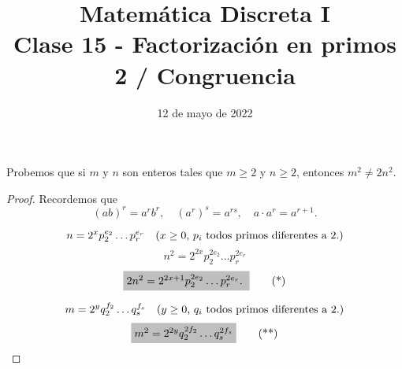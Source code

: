 \documentclass{beamer}
\title[Clase 15 - Factorización en primos]{Matemática Discreta I \\ Clase 15 - Factorización en primos 2 / Congruencia}
\institute[]{\normalsize FAMAF / UNC
    \\[\baselineskip] ${}^{}$
    \\[\baselineskip]
}
\date[12/05/2022]{12 de mayo de 2022}
\begin{document}
    
    \frame{\titlepage} 
    
    
    \begin{frame}
        
        \begin{ejemplo} Probemos que si $m$ y $n$ son enteros tales que
            $m\ge 2$ y $n\ge 2$, entonces $m^2 \not=2n^2$.
        \end{ejemplo}\pause
        \begin{proof} \pause

        Recordemos que
        $$
        (ab)^r = a^rb^r, \quad (a^r)^s = a^{r s}, \quad  a\cdot a^r = a^{r+1}. 
        $$    


            $$ n = 2^{x}p_2^{e_2}\ldots p_r^{e_r}\text{\quad ($x \ge 0$, $p_i$ todos primos diferentes a 2.)} $$
            $$ n^2 = 2^{2x}p_2^{2e_2}\ldots p_r^{2e_r}$$
            \begin{equation}
                \colorbox{lightgray}{$2n^2= 2^{2x+1}p_2^{2e_2}\ldots p_r^{2e_r}.$ }\tag{*}
            \end{equation}
            
            $$
            m = 2^{y}q_2^{f_2}\ldots q_s^{f_s}\text{\quad ($y \ge 0$, $q_i$ todos primos diferentes a 2.)}
            $$
            \begin{equation}
                \colorbox{lightgray}{$m^2 = 2^{2y}q_2^{2f_2}\ldots q_s^{2f_s}$} \tag{**}
            \end{equation}
            
        \end{proof}
        
    \end{frame}
    
\end{document}
